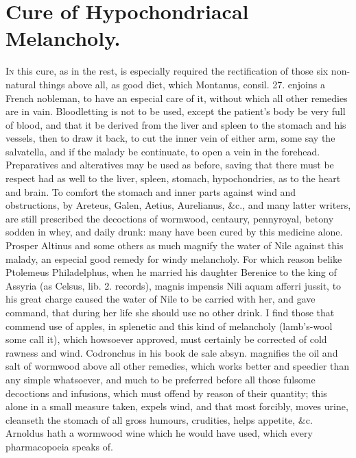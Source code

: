 \section{Cure of Hypochondriacal Melancholy.}

\lettrine{I}{n} this cure, as in the rest, is especially required the rectification
of those six non-natural things above all, as good diet, which
Montanus, consil. 27. enjoins a French nobleman, to have an especial
care of it, without which all other remedies are in vain. Bloodletting
is not to be used, except the patient's body be very full of blood, and
that it be derived from the liver and spleen to the stomach and his
vessels, then to draw it back, to cut the inner vein of either
arm, some say the salvatella, and if the malady be continuate, to
open a vein in the forehead.
Preparatives and alteratives may be used as before, saving that there
must be respect had as well to the liver, spleen, stomach,
hypochondries, as to the heart and brain. To comfort the stomach
and inner parts against wind and obstructions, by Areteus, Galen,
Aetius, Aurelianus, \&c., and many latter writers, are still prescribed
the decoctions of wormwood, centaury, pennyroyal, betony sodden in
whey, and daily drunk: many have been cured by this medicine alone.
Prosper Altinus and some others as much magnify the water of Nile
against this malady, an especial good remedy for windy melancholy. For
which reason belike Ptolemeus Philadelphus, when he married his
daughter Berenice to the king of Assyria (as Celsus, lib. 2. records),
magnis impensis Nili aquam afferri jussit, to his great charge caused
the water of Nile to be carried with her, and gave command, that during
her life she should use no other drink. I find those that commend use
of apples, in splenetic and this kind of melancholy (lamb's-wool some
call it), which howsoever approved, must certainly be corrected of cold
rawness and wind.
Codronchus in his book de sale absyn. magnifies the oil and salt of
wormwood above all other remedies, which works better and
speedier than any simple whatsoever, and much to be preferred before
all those fulsome decoctions and infusions, which must offend by reason
of their quantity; this alone in a small measure taken, expels wind,
and that most forcibly, moves urine, cleanseth the stomach of all gross
humours, crudities, helps appetite, \&c. Arnoldus hath a wormwood wine
which he would have used, which every pharmacopoeia speaks of.
